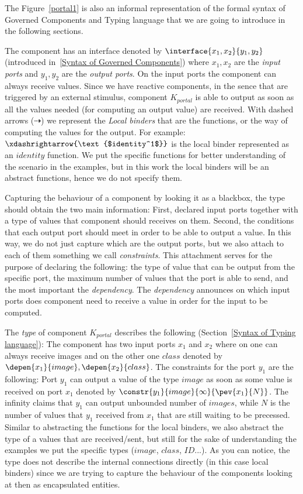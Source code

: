  The Figure~\ref{portal1} is also an informal representation of the formal syntax of Governed Components and Typing language that we are going to introduce in the following sections.  
 
 The component has an interface denoted by $\interface{x_1,x_2}{y_1,y_2}$ (introduced in~\ref{Syntax of Governed Components}) where $x_1,x_2$ are the \textit{input ports} and $y_1,y_2$ are the \textit{output ports}. On the input ports the component can always receive values. Since we have reactive components, in the sence that are triggered by an external stimulus, component $K_{portal}$ is able to output as soon as all the values needed (for computing an output value) are received. With dashed arrows ($\dashrightarrow$) we represent the \textit{Local binders} that are the functions, or the way of computing the values for the output. For example: $\xdashrightarrow{\text{$identity^1$}}$ is the local binder represented as an $identity$ function. We put the specific functions for better understanding of the scenario in the examples, but in this work the local binders will be an abstract functions, hence we do not specify them.
 

Capturing the behaviour of a component by looking it as a blackbox, the type should obtain the two main information: First, declared input ports together with a type of values that component should receives on them. Second, the conditions that each output port should meet in order to be able to output a value. In this way, we do not just capture which are the output ports, but we also attach to each of them something we call \textit{constraints}. This attachment serves for the purpose of declaring the following: the type of value that can be output from the specific port, the maximum number of values that the port is able to send, and the most important the \textit{dependency}. The \textit{dependency} announces on which input ports does component need to receive a value in order for the input to be computed.  

The \textit{type} of component $K_{portal}$ describes the following (Section~\ref{Syntax of Typing language}): The component has two input ports $x_1$ and $x_2$ where on one can always receive images and on the other one $class$ denoted by $\depen{x_1}{image},\depen{x_2}{class}$. The constraints for the port $y_1$ are the following: Port $y_1$ can output a value of the type $image$ as soon as some value is received on port $x_1$ denoted by $\constr{y_1}{image}{\infty}{\pev{x_1}{N}}$. The infinity claims that $y_1$ can output unbounded number of $images$, while $N$ is the number of values that $y_1$ received from $x_1$ that are still waiting to be precessed. Similar to abstracting the functions for the local binders, we also abstract the type of a values that are received/sent, but still for the sake of understanding the examples we put the specific types ($image$, $class$, $ID$...). As you can notice, the type does not describe the internal connections directly (in this case local binders) since we are trying to capture the behaviour of the components looking at then as encapsulated entities. 

